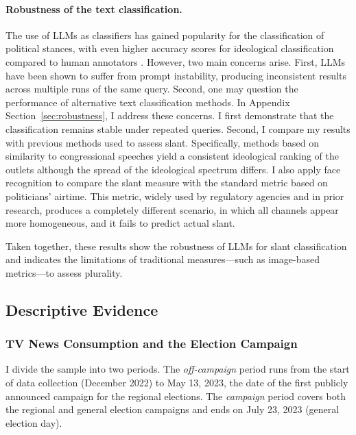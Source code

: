 \documentclass[12pt]{article}
\begin{document}
	\FloatBarrier
	
	\paragraph{Robustness of the text classification.}
	
	The use of LLMs as classifiers has gained popularity for the classification of political stances, with even higher accuracy scores for ideological classification compared to human annotators \citep[see, e.g.,][]{lemens,tornberg2023,Gilardi2023ChatGPTOC}. However, two main concerns arise. First, LLMs have been shown to suffer from prompt instability, producing inconsistent results across multiple runs of the same query. Second, one may question the performance of alternative text classification methods. In Appendix Section~\ref{sec:robustness}, I address these concerns. I first demonstrate that the classification remains stable under repeated queries. Second, I compare my results with previous methods used to assess slant. Specifically, methods based on similarity to congressional speeches \citep{gentzkow2010media,laver2003extracting} yield a consistent ideological ranking of the outlets although the spread of the ideological spectrum differs. I also apply face recognition to compare the slant measure with the standard metric based on politicians’ airtime. This metric, widely used by regulatory agencies and in prior research, produces a completely different scenario, in which all channels appear more homogeneous, and it fails to predict actual slant.
	
	Taken together, these results show the robustness of LLMs for slant classification and indicates the limitations of traditional measures—such as image-based metrics—to assess plurality. 
	
	
	

	\subsection{Descriptive Evidence}


	\subsubsection*{TV News Consumption and the Election Campaign}

	
	
	
	I divide the sample into two periods. The \textit{off-campaign} period runs from the start of data collection (December 2022) to May 13, 2023, the date of the first publicly announced campaign for the regional elections. The \textit{campaign} period covers both the regional and general election campaigns and ends on July 23, 2023 (general election day). 
	
\end{document}
